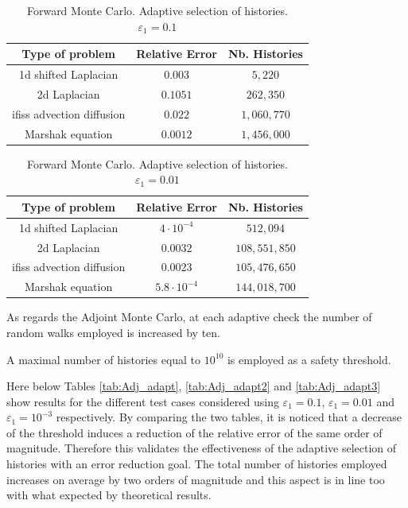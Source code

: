 \documentclass[a4paper,10pt]{article}
\begin{document}
\begin{table}[!h]
\centering
\begin{tabular}{|c|c|c|}
\hline
\textbf{Type of problem} & \textbf{Relative Error} &\textbf{Nb. Histories}\\
\hline
1d shifted Laplacian & $0.003$ & $5,220$\\
\hline
2d Laplacian & $0.1051$ & $262,350$\\
\hline
ifiss advection diffusion & $0.022$  & $1,060,770$\\
\hline
Marshak equation & $0.0012$ & $1,456,000$\\
\hline
\end{tabular}
\caption{Forward Monte Carlo. Adaptive selection of histories.
$\varepsilon_1=0.1$}
\label{tab:For_adapt}
\end{table}

\begin{table}[!h]
\centering
\begin{tabular}{|c|c|c|}
\hline
\textbf{Type of problem} & \textbf{Relative Error} &\textbf{Nb. Histories}\\
\hline
1d shifted Laplacian & $4\cdot 10^{-4}$ & $512,094$\\
\hline
2d Laplacian & $0.0032$ & $108,551,850$\\
\hline
ifiss advection diffusion & $0.0023$  & $105,476,650$\\
\hline
Marshak equation & $5.8 \cdot 10^{-4}$ & $144,018,700$\\
\hline
\end{tabular}
\caption{Forward Monte Carlo. Adaptive selection of histories.
$\varepsilon_1=0.01$}
\label{tab:For_adapt2}
\end{table}

As regards the Adjoint Monte Carlo, at each adaptive check the number of
random walks employed is increased by ten.

A maximal number of histories equal to $10^10$ is employed as a safety
threshold.

Here below Tables \ref{tab:Adj_adapt}, \ref{tab:Adj_adapt2} and
\ref{tab:Adj_adapt3} show results
for the different test cases
considered using $\varepsilon_1=0.1$, $\varepsilon_1=0.01$ and
$\varepsilon_1=10^{-3}$ respectively.
By comparing the two tables, it is noticed that a decrease of the threshold
induces a reduction of the relative error of the same order of magnitude.
Therefore this validates
the effectiveness of the adaptive selection of histories with an error
reduction goal. The total number of histories employed increases on average by
two orders of magnitude and this aspect is in line too with what expected by
theoretical results.
\end{document}
